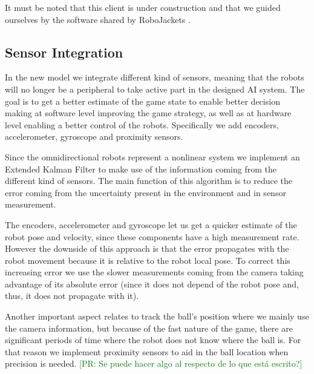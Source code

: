 \documentclass{llncs}
\newcommand{\PR}[1]{{\textcolor{green}{[PR: #1]}}}  %
\begin{document}
It must be noted that this client is under construction and that we guided ourselves by the software shared by RoboJackets \cite{robojackets}. 

\subsection{Sensor Integration}
In the new model we integrate different kind of sensors, meaning that the robots will no longer be a peripheral to take active part in the designed AI system. The goal is to get a better estimate of the game state to enable better decision making at software level improving the game strategy, as well as at hardware level enabling a better control of the robots. Specifically we add encoders, accelerometer, gyroscope and proximity sensors.

Since the omnidirectional robots represent a nonlinear system we implement an Extended Kalman Filter  to make use of the information coming from the different kind of sensors. The main function of this algorithm is to reduce the error coming from the uncertainty present in the environment and in sensor measurement.

The encoders, accelerometer and gyroscope let us get a quicker estimate of the robot pose and velocity, since these components have a high measurement rate. However the downside of this approach is that the error propagates with the robot movement because it is relative to the robot local pose. To correct this increasing error we use the slower measurements coming from the camera taking advantage of its absolute error (since it does not depend of the robot pose and, thus, it does not propagate with it).    

Another important aspect relates to track the ball's position where we mainly use the camera information, but because of the fast nature of the game, there are significant periods of time where the robot does not know where the ball is. For that reason we implement proximity sensors to aid in the ball location when precision is needed. \PR{Se puede hacer algo al respecto de lo que está escrito?}

%
\end{document}
